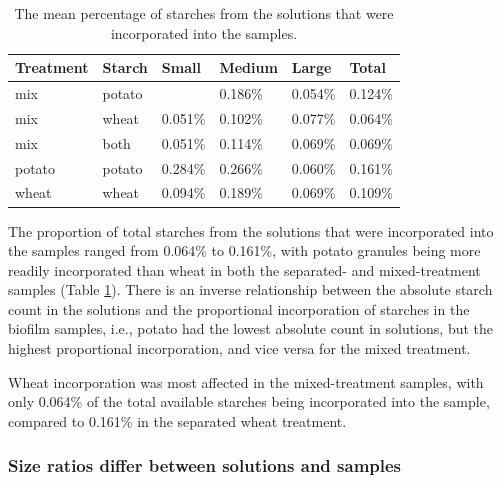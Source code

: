 \documentclass[
]{article}
\begin{document}
\begin{table}

\caption{\label{tab:sample-prop-tbl}The mean percentage of starches from the solutions that 
              were incorporated into the samples.}
\centering
\begin{tabular}[t]{l|l|l|l|l|l}
\hline
Treatment & Starch & Small & Medium & Large & Total\\
\hline
mix & potato &  & 0.186\% & 0.054\% & 0.124\%\\
\hline
mix & wheat & 0.051\% & 0.102\% & 0.077\% & 0.064\%\\
\hline
mix & both & 0.051\% & 0.114\% & 0.069\% & 0.069\%\\
\hline
potato & potato & 0.284\% & 0.266\% & 0.060\% & 0.161\%\\
\hline
wheat & wheat & 0.094\% & 0.189\% & 0.069\% & 0.109\%\\
\hline
\end{tabular}
\end{table}

The proportion of total starches from the solutions that were incorporated
into the samples ranged from
0.064\% to 0.161\%,
with potato granules being more readily incorporated than wheat in both the
separated- and mixed-treatment samples
(Table \ref{tab:sample-prop-tbl}).
There is an inverse relationship between the absolute starch count in the solutions
and the proportional incorporation of starches in the biofilm samples, i.e., potato
had the lowest absolute count in solutions, but the highest proportional
incorporation, and vice versa for the mixed treatment.

Wheat incorporation was most affected in the mixed-treatment samples, with only
0.064\% of the total available starches being incorporated into
the sample, compared to
0.161\%
in the separated wheat treatment.

\hypertarget{size-ratios-differ-between-solutions-and-samples}{%
\subsubsection{Size ratios differ between solutions and samples}\label{size-ratios-differ-between-solutions-and-samples}}
\end{document}
